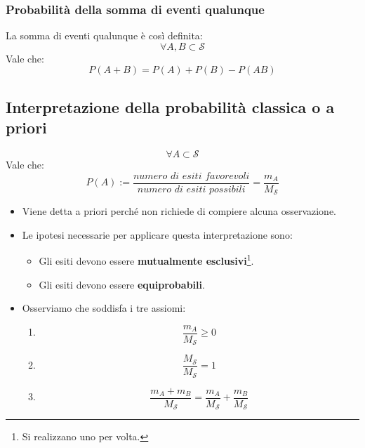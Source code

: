 \documentclass[11pt,a4paper]{book}
\begin{document}
\subsubsection{Probabilità della somma di eventi qualunque} 
La somma di eventi qualunque è così definita:
\begin{equation}
\forall A,B \subset \mathcal{S}
\end{equation}
Vale che:
\begin{equation}
P(A+B) = P(A)+P(B)-P(AB)
\end{equation}
\subsection{Interpretazione della probabilità classica o a priori} 
\begin{equation}
\forall A \subset \mathcal{S}
\end{equation}
Vale che:
\begin{equation}
P(A) := \dfrac{\textit{numero di esiti favorevoli}}{\textit{numero di esiti possibili}}= \frac{m_A}{M_\mathcal{S}}
\end{equation}
\begin{itemize}
\item Viene detta a priori perché non richiede di compiere alcuna osservazione.
\item Le ipotesi necessarie per applicare questa interpretazione sono:
\begin{itemize}
\item Gli esiti devono essere \textbf{mutualmente esclusivi}\footnote{Si realizzano uno per volta.}.
\item Gli esiti devono essere \textbf{equiprobabili}.
\end{itemize}
\item Osserviamo che soddisfa i tre assiomi:
\begin{enumerate}
\item 
\begin{equation}
\frac{m_A}{M_\mathcal{S}} \geq 0
\end{equation}
\item 
\begin{equation}
\frac{M_\mathcal{S}}{M_\mathcal{S}} = 1
\end{equation}
\item 
\begin{equation}
\frac{m_A + m_B}{M_\mathcal{S}} = \frac{m_A}{M_\mathcal{S}} +\frac{m_B}{M_\mathcal{S}} 
\end{equation}
\end{enumerate}
\end{itemize}
\end{document}
